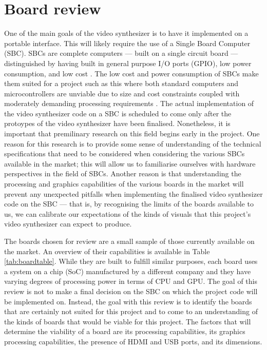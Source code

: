 \documentclass[../initial_thesis.tex]{subfiles}
\begin{document}
\section{Board review}\label{sec:boardreview}
One of the main goals of the video synthesizer is to have it implemented on a portable interface. This will likely require the use of a Single Board Computer (SBC). SBCs are complete computers --- built on a single circuit board --- distinguished by having built in general purpose I/O ports (GPIO), low power consumption, and low cost \cite{Johnston2018}. The low cost and power consumption of SBCs make them suited for a project such as this where both standard computers and microcontrollers are unviable due to size and cost constraints coupled with moderately demanding processing requirements \cite{Johnston2018}. The actual implementation of the video synthesizer code on a SBC is scheduled to come only after the protoypes of the video synthesizer have been finalised. Nonetheless, it is important that premilinary research on this field begins early in the project. One reason for this research is to provide some sense of understanding of the technical specifications that need to be considered when considering the various SBCs available in the market; this will allow us to familiarise ourselves with hardware perspectives in the field of SBCs. Another reason is that understanding the processing and graphics capabilities of the various boards in the market will prevent any unexpected pitfalls when implementing the finalised video synthesizer code on the SBC --- that is, by recognising the limits of the boards available to us, we can calibrate our expectations of the kinds of visuals that this project's video synthesizer can expect to produce. \par

The boards chosen for review are a small sample of those currently available on the market. An overview of their capabilities is available in Table \ref{tab:boardtable}. While they are built to fulfill similar purposes, each board uses a system on a chip (SoC) manufactured by a different company and they have varying degrees of processing power in terms of CPU and GPU. The goal of this review is not to make a final decision on the SBC on which the project code will be implemented on. Instead, the goal with this review is to identify the boards that are certainly not suited for this project and to come to an understanding of the kinds of boards that would be viable for this project. The factors that will determine the viability of a board are its processing capabilities, its graphics processing capabilities, the presence of HDMI and USB ports, and its dimensions. \par
\end{document}
